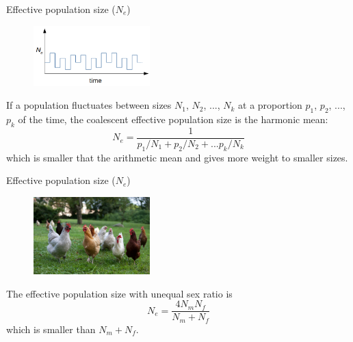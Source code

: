 \begin{frame}{Effective population size ($N_e$)}

	\begin{figure}
                \includegraphics[width=0.4\textwidth]{Pics/ne_change}
	\end{figure}

	\small

	If a population fluctuates between sizes $N_1$, $N_2$, ..., $N_k$ at a proportion $p_1$, $p_2$, ..., $p_k$
	of the time, the coalescent effective population size is the harmonic mean:
	\begin{equation}
		N_e = \frac{1}{p_1/N_1 + p_2/N_2 + ... p_k/N_k}
	\end{equation}
	which is smaller that the arithmetic mean and gives more weight to smaller sizes.


\end{frame}


\begin{frame}{Effective population size ($N_e$)}

	\begin{figure}
                \includegraphics[width=0.4\textwidth]{Pics/chickens}
        \end{figure}

	The effective population size with unequal sex ratio is
	\begin{equation}
		N_e = \frac{4N_mN_f}{N_m+N_f}
	\end{equation}
	which is smaller than $N_m+N_f$.

\end{frame}


